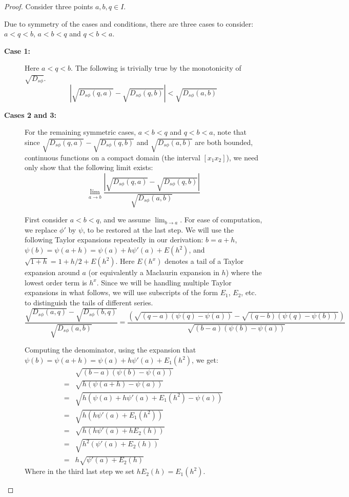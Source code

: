 \documentclass[11pt]{myclass}
\newcommand{\sbreg}{\ensuremath{D_{s\phi}}}
\begin{document}
\begin{proof}
Consider three points $a,b,q \in I$. 

Due to symmetry of the cases and conditions, there are three cases to consider: $a<q<b$, $a < b <q$ and $q < b < a$.
\begin{description}
\item[\textbf{Case 1:}]
Here $a < q < b$. The following is trivially true by the monotonicity of $\sqrt{\sbreg}$.
\begin{equation}
\left| \sqrt{\sbreg(q,a)} - \sqrt{\sbreg(q,b)} \right| <  \sqrt{\sbreg(a,b)}
\end{equation}


\item[\textbf{Cases 2 and 3:}]
For the remaining symmetric cases, $a < b< q$ and $q<b<a$, note that since $\sqrt{\sbreg(q,a)} - \sqrt{\sbreg(q,b)}$ and $\sqrt{\sbreg(a,b)}$ are both bounded, continuous functions on a compact domain (the interval $[x_1 x_2]$), we need only show that the following limit exists:
\begin{equation}\label{mu-def-limit}
  \lim_{a \to b} \frac{\left| \sqrt{\sbreg(q,a)} - \sqrt{\sbreg(q,b)} \right|}{\sqrt{\sbreg(a,b)}}
\end{equation}

First consider $a<b<q$, and we assume $\lim_{b \to a}$. For ease of computation, we replace $\phi'$ by $\psi$, to be restored 
at the last step. We will use the following Taylor expansions repeatedly in our derivation: $b = a +h$, $ \psi(b) = \psi(a+h) =  \psi(a) + h\psi'(a) + E(h^2)$,  and $ \sqrt{1+h} =  1 + h/2 + E(h^2)$.  Here $E(h^x)$ denotes a tail of a Taylor expansion
around $a$ (or equivalently a Maclaurin expansion in $h$) where the lowest order term is $h^x$. Since we will be handling
multiple Taylor expansions in what follows, we will use subscripts of the form $E_1$, $E_2$, etc. to distinguish the tails
of different series.  
\begin{equation}\label{mucomp}
 \frac{\sqrt{\sbreg(a,q)} - \sqrt{\sbreg(b,q)}}{\sqrt{\sbreg(a,b)}} 
= \frac{ \left(\sqrt{(q-a)(\psi(q) - \psi(a)) }  - \sqrt{(q-b)(\psi(q) - \psi(b)) } \right)}
       {\sqrt{(b-a)(\psi(b) - \psi(a)) }}
\end{equation}

Computing the denominator, using the expansion that $\psi(b) = \psi(a+h) = \psi(a) + h \psi'(a) + E_1(h^2)$, we get:
\begin{align*}
& \sqrt{(b-a) (\psi(b) - \psi(a)) }  
\\ =& \sqrt{h (\psi(a+h) - \psi(a)) } 
\\ =& \sqrt{h ( \psi(a) + h \psi'(a) + E_1(h^2) - \psi(a)) } 
\\ =& \sqrt{h (h \psi'(a)+ E_1(h^2))} 
\\ =& \sqrt{h (h \psi'(a)+ h E_2(h))} 
\\ =&  \sqrt{h^2(\psi'(a)+ E_2(h))}
\\ =& h \sqrt{\psi'(a) + E_2(h)} 
\end{align*}
Where in the third last step we set $h E_2(h) = E_1(h^2)$.


\end{description}
\end{proof}
\end{document}
